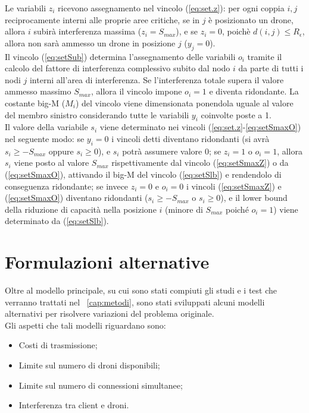 Le variabili $z_i$ ricevono assegnamento nel vincolo (\ref{eq:set.z}): per ogni coppia $i, j$ reciprocamente interni alle proprie aree critiche, se in $j$ è posizionato un drone, allora $i$ subirà interferenza massima ($z_i = S_{max}$), e se $z_i = 0$, poichè $d(i,j) \leq R_\epsilon$, allora non sarà ammesso un drone in posizione $j$ ($y_j = 0$). \\
Il vincolo (\ref{eq:setSub}) determina l'assegnamento delle variabili $o_i$ tramite il calcolo del fattore di interferenza complessivo subito dal nodo $i$ da parte di tutti i nodi $j$ interni all'area di interferenza. Se l'interferenza totale supera il valore ammesso massimo $S_{max}$, allora il vincolo impone $o_i = 1$ e diventa ridondante.
La costante big-M ($M_i$) del vincolo viene dimensionata ponendola uguale al valore del membro sinistro considerando tutte le variabili $y_i$ coinvolte poste a 1.\\ 
Il valore della variabile $s_i$ viene determinato nei vincoli (\ref{eq:set.z}-\ref{eq:setSmaxO}) nel seguente modo: se $y_i = 0$ i vincoli detti diventano ridondanti (si avrà $s_i \geq - S_{max}$ oppure $s_i \geq 0$), e $s_i$ potrà assumere valore 0; se $z_i = 1$ o $o_i = 1$, allora $s_i$ viene posto al valore $S_{max}$ rispettivamente dal vincolo (\ref{eq:setSmaxZ}) o da (\ref{eq:setSmaxO}), attivando il big-M del vincolo (\ref{eq:setSlb}) e rendendolo di conseguenza ridondante; se invece $z_i = 0$ e $o_i = 0$ i vincoli (\ref{eq:setSmaxZ}) e (\ref{eq:setSmaxO}) diventano ridondanti ($s_i \geq - S_{max}$ o $s_i \geq 0$), e il lower bound della riduzione di capacità nella posizione $i$ (minore di $S_{max}$ poiché $o_i = 1$) viene determinato da (\ref{eq:setSlb}).  \\

\section{Formulazioni alternative}
Oltre al modello principale, su cui sono stati compiuti gli studi e i test che verranno trattati nel \chaptername\ \ref{cap:metodi}, sono stati sviluppati alcuni modelli alternativi per risolvere variazioni del problema originale. \\ Gli aspetti che tali modelli riguardano sono:

\begin{itemize}
	\item Costi di trasmissione;
	\item Limite sul numero di droni disponibili;
	\item Limite sul numero di connessioni simultanee;
	\item Interferenza tra client e droni.
\end{itemize}

